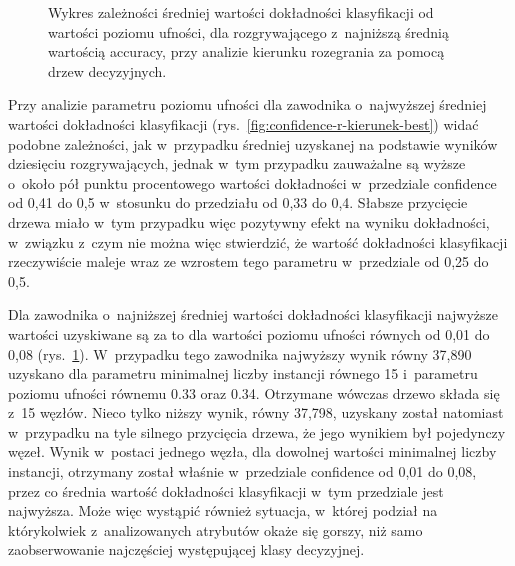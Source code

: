 \documentclass[a4paper,twoside,12pt]{book}
\begin{document}
\begin{figure}
\centering
{}
\caption{Wykres zależności średniej wartości dokładności klasyfikacji od wartości poziomu ufności, dla rozgrywającego z~najniższą średnią wartością accuracy, przy analizie kierunku rozegrania za pomocą drzew decyzyjnych.}
\label{fig:confidence-r-kierunek-worst}
\end{figure}

Przy analizie parametru poziomu ufności dla zawodnika o~najwyższej średniej wartości dokładności klasyfikacji (rys.~\ref{fig:confidence-r-kierunek-best}) widać podobne zależności, jak w~przypadku średniej uzyskanej na podstawie wyników dziesięciu rozgrywających, jednak w~tym przypadku zauważalne są wyższe o~około pół punktu procentowego wartości dokładności w~przedziale confidence od 0,41 do 0,5 w~stosunku do przedziału od 0,33 do 0,4. Słabsze przycięcie drzewa miało w~tym przypadku więc pozytywny efekt na wyniku dokładności, w~związku z~czym nie można więc stwierdzić, że wartość dokładności klasyfikacji rzeczywiście maleje wraz ze wzrostem tego parametru w~przedziale od 0,25 do 0,5. 

Dla zawodnika o~najniższej średniej wartości dokładności klasyfikacji najwyższe wartości uzyskiwane są za to dla wartości poziomu ufności równych od 0,01 do 0,08 (rys.~\ref{fig:confidence-r-kierunek-worst}). W~przypadku tego zawodnika najwyższy wynik równy 37,890 uzyskano dla parametru minimalnej liczby instancji równego 15 i~parametru poziomu ufności równemu 0.33 oraz 0.34. Otrzymane wówczas drzewo składa się z~15 węzłów. Nieco tylko niższy wynik, równy 37,798, uzyskany został natomiast w~przypadku na tyle silnego przycięcia drzewa, że jego wynikiem był pojedynczy węzeł. Wynik w~postaci jednego węzła, dla dowolnej wartości minimalnej liczby instancji, otrzymany został właśnie w~przedziale confidence od 0,01 do 0,08, przez co średnia wartość dokładności klasyfikacji w~tym przedziale jest najwyższa. Może więc wystąpić również sytuacja, w~której podział na którykolwiek z~analizowanych atrybutów okaże się gorszy, niż samo zaobserwowanie najczęściej występującej klasy decyzyjnej. 
\end{document}
